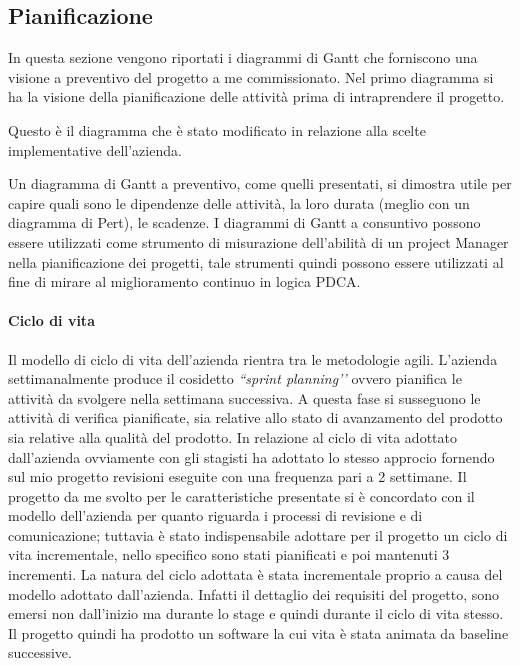 \subsection{Pianificazione}
In questa sezione vengono riportati i diagrammi di Gantt che forniscono una visione a preventivo del progetto a me commissionato. Nel primo diagramma si ha la visione della pianificazione delle attivit\`{a} prima di intraprendere il progetto.

Questo \`{e} il diagramma che \`{e} stato modificato in relazione alla scelte implementative dell\textquoteright{}azienda.

Un diagramma di Gantt a preventivo, come quelli presentati, si dimostra utile per capire quali sono le dipendenze delle attivit\`{a}, la loro durata (meglio con un diagramma di Pert), le scadenze. I diagrammi di Gantt a consuntivo possono essere utilizzati come strumento di misurazione dell\textquoteright{}abilit\`{a} di un project Manager nella pianificazione dei progetti, tale strumenti quindi possono essere utilizzati al fine di mirare al miglioramento continuo in logica PDCA.

\paragraph{Ciclo di vita}
Il modello di ciclo di vita dell\textquoteright{}azienda rientra tra le metodologie agili. L\textquoteright{}azienda settimanalmente produce il cosidetto \textit{``sprint planning\textquoteright{}\textquoteright{}} ovvero pianifica le attivit\`{a} da svolgere nella settimana successiva. A questa fase si susseguono le attivit\`{a} di verifica pianificate, sia relative allo stato di avanzamento del prodotto sia relative alla qualit\`{a} del prodotto. In relazione al ciclo di vita adottato dall\textquoteright{}azienda ovviamente con gli stagisti ha adottato lo stesso approcio fornendo sul mio progetto revisioni eseguite con una frequenza pari a 2 settimane. Il progetto da me svolto per le caratteristiche presentate si \`{e} concordato con il modello dell\textquoteright{}azienda per quanto riguarda i processi di revisione e di comunicazione; tuttavia \`{e} stato indispensabile adottare per il progetto un ciclo di vita incrementale, nello specifico sono stati pianificati e poi mantenuti 3 incrementi. La natura del ciclo adottata \`{e} stata incrementale proprio a causa del modello adottato dall\textquoteright{}azienda. Infatti il dettaglio dei requisiti del progetto, sono emersi non dall\textquoteright{}inizio ma durante lo stage e quindi durante il ciclo di vita stesso. Il progetto quindi ha prodotto un software la cui vita \`{e} stata animata da baseline successive.